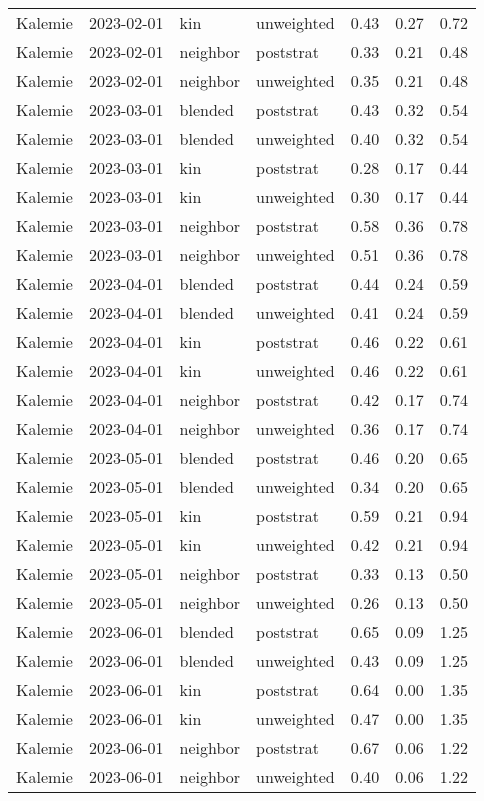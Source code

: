 \begin{table}[ht]
\begin{tabular}{llllrrr}
  Kalemie & 2023-02-01 & kin & unweighted & 0.43 & 0.27 & 0.72 \\ 
  Kalemie & 2023-02-01 & neighbor & poststrat & 0.33 & 0.21 & 0.48 \\ 
  Kalemie & 2023-02-01 & neighbor & unweighted & 0.35 & 0.21 & 0.48 \\ 
  Kalemie & 2023-03-01 & blended & poststrat & 0.43 & 0.32 & 0.54 \\ 
  Kalemie & 2023-03-01 & blended & unweighted & 0.40 & 0.32 & 0.54 \\ 
  Kalemie & 2023-03-01 & kin & poststrat & 0.28 & 0.17 & 0.44 \\ 
  Kalemie & 2023-03-01 & kin & unweighted & 0.30 & 0.17 & 0.44 \\ 
  Kalemie & 2023-03-01 & neighbor & poststrat & 0.58 & 0.36 & 0.78 \\ 
  Kalemie & 2023-03-01 & neighbor & unweighted & 0.51 & 0.36 & 0.78 \\ 
  Kalemie & 2023-04-01 & blended & poststrat & 0.44 & 0.24 & 0.59 \\ 
  Kalemie & 2023-04-01 & blended & unweighted & 0.41 & 0.24 & 0.59 \\ 
  Kalemie & 2023-04-01 & kin & poststrat & 0.46 & 0.22 & 0.61 \\ 
  Kalemie & 2023-04-01 & kin & unweighted & 0.46 & 0.22 & 0.61 \\ 
  Kalemie & 2023-04-01 & neighbor & poststrat & 0.42 & 0.17 & 0.74 \\ 
  Kalemie & 2023-04-01 & neighbor & unweighted & 0.36 & 0.17 & 0.74 \\ 
  Kalemie & 2023-05-01 & blended & poststrat & 0.46 & 0.20 & 0.65 \\ 
  Kalemie & 2023-05-01 & blended & unweighted & 0.34 & 0.20 & 0.65 \\ 
  Kalemie & 2023-05-01 & kin & poststrat & 0.59 & 0.21 & 0.94 \\ 
  Kalemie & 2023-05-01 & kin & unweighted & 0.42 & 0.21 & 0.94 \\ 
  Kalemie & 2023-05-01 & neighbor & poststrat & 0.33 & 0.13 & 0.50 \\ 
  Kalemie & 2023-05-01 & neighbor & unweighted & 0.26 & 0.13 & 0.50 \\ 
  Kalemie & 2023-06-01 & blended & poststrat & 0.65 & 0.09 & 1.25 \\ 
  Kalemie & 2023-06-01 & blended & unweighted & 0.43 & 0.09 & 1.25 \\ 
  Kalemie & 2023-06-01 & kin & poststrat & 0.64 & 0.00 & 1.35 \\ 
  Kalemie & 2023-06-01 & kin & unweighted & 0.47 & 0.00 & 1.35 \\ 
  Kalemie & 2023-06-01 & neighbor & poststrat & 0.67 & 0.06 & 1.22 \\ 
  Kalemie & 2023-06-01 & neighbor & unweighted & 0.40 & 0.06 & 1.22 \\ 
  \end{tabular}
\caption{} 
\label{table:preregister_monthly}
\end{table}
